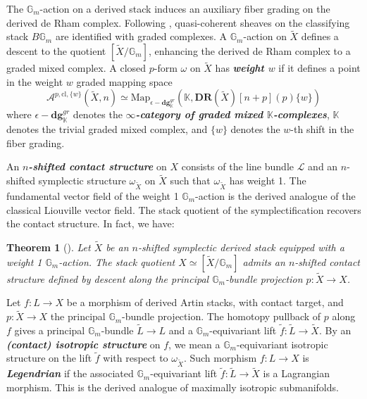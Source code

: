 \documentclass[reqno]{amsart}
\newcommand{\bfem}[1]{\textbf{\textit{#1}}}
\newcommand{\Gm}{\mathbb{G}_m}
\newcommand{\cL}{\mathcal{L}}
\newcommand{\K}{\mathbb{K}}
\newtheorem{theorem}{Theorem}[section]
\begin{document}
The $\Gm$-action on a derived stack induces an auxiliary fiber grading on the derived de Rham complex. Following \cite[Section 2.1.1]{Calaque}, quasi-coherent sheaves on the classifying stack $B\Gm$ are identified with graded complexes. A $\Gm$-action on $\widetilde{X}$ defines a descent to the quotient $[\widetilde{X}/\Gm]$, enhancing the derived de Rham complex to a graded mixed complex. A closed $p$-form $\omega$ on $\widetilde{X}$ has \bfem{weight $w$} if it defines a point in the weight $w$ graded mapping space
\[
    \mathcal{A}^{p, \mathrm{cl}, \{w\}}(\widetilde{X}, n) \simeq \mathrm{Map}_{\epsilon-\mathbf{dg}_{\K}^{gr}}(\K, \mathbf{DR}(\widetilde{X})[n+p](p)\{w\})
\]
where $\epsilon-\mathbf{dg}_{\K}^{gr}$ denotes the \bfem{$\infty$-category of graded mixed $\K$-complexes}, $\K$ denotes the trivial graded mixed complex, and $\{w\}$ denotes the $w$-th shift in the fiber grading.

An \bfem{$n$-shifted contact structure} on $X$ consists of the line bundle $\cL$ and an $n$-shifted symplectic structure $\omega_{\widetilde{X}}$ on $\widetilde{X}$ such that $\omega_{\widetilde{X}}$ has weight 1. The fundamental vector field of the weight 1 $\Gm$-action is the derived analogue of the classical Liouville vector field. The stack quotient of the symplectification recovers the contact structure. In fact, we have:

\begin{theorem}[\cite{IzbudakBerktav}]
Let $\widetilde{X}$ be an $n$-shifted symplectic derived stack equipped with a weight 1 $\Gm$-action. The stack quotient $X \simeq [\widetilde{X} / \Gm]$ admits an $n$-shifted contact structure defined by descent along the principal $\Gm$-bundle projection $p \colon \widetilde{X} \to X$.
\end{theorem}

Let $f \colon L \to X$ be a morphism of derived Artin stacks, with contact target, and $p \colon \widetilde{X} \to X$ the principal $\Gm$-bundle projection. The homotopy pullback of $p$ along $f$ gives a principal $\Gm$-bundle $\widetilde{L} \to L$ and a $\Gm$-equivariant lift $\widetilde{f} \colon \widetilde{L} \to \widetilde{X}$. By an \bfem{(contact) isotropic structure} on $f$, we mean a $\Gm$-equivariant isotropic structure on the lift $\widetilde{f}$ with respect to $\omega_{\widetilde{X}}$.
Such morphism $f \colon L \to X$ is \bfem{Legendrian} if the associated $\Gm$-equivariant lift $\widetilde{f} \colon \widetilde{L} \to \widetilde{X}$ is a Lagrangian morphism. This is the derived analogue of maximally isotropic submanifolds.
\end{document}
